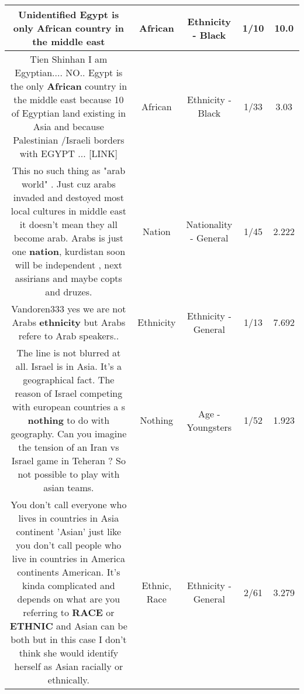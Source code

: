 \documentclass[11pt]{article}
\newlength\mylength
\begin{document}
\begin{center}
\begin{longtable}{|C{.65\mylength}|C{.30\mylength}|C{.12\mylength}|C{.12\mylength}|C{.12\mylength}|}
  \small Unidentified Egypt is only \textbf{African} country in the middle east\normalsize   & African & Ethnicity - Black & 1/10 & 10.0 \\  \hline
  \small Tien Shinhan  I am Egyptian.... NO.. Egypt is the only \textbf{African} country in the middle east because 10 of Egyptian land existing in Asia and because Palestinian /Israeli borders with EGYPT ...  [LINK] \normalsize   & African & Ethnicity - Black & 1/33 & 3.03 \\  \hline
  \small This no such thing as "arab world" . Just cuz arabs invaded and destoyed most local cultures  in middle east it doesn't mean they all become arab. Arabs is just one \textbf{nation}, kurdistan soon will be independent , next assirians and maybe copts and druzes.\normalsize   & Nation & Nationality - General & 1/45 & 2.222 \\  \hline
  \small Vandoren333 yes we are not Arabs \textbf{ethnicity} but Arabs refere to Arab speakers..\normalsize   & Ethnicity & Ethnicity - General & 1/13 & 7.692 \\  \hline
  \small The line is not blurred at all. Israel is in Asia. It's a geographical fact. The reason of Israel competing with european countries a s \textbf{nothing} to do with geography.  Can you imagine the tension of an Iran vs Israel game in Teheran ? So not possible to play with asian teams.\normalsize   & Nothing & Age - Youngsters & 1/52 & 1.923 \\  \hline
  \small You don't call everyone who lives in countries in Asia continent 'Asian' just like you don't call people who live in countries in America continents American. It's kinda complicated and depends on what are you referring to \textbf{RACE} or \textbf{ETHNIC} and Asian can be both but in this case I don't think she would identify herself as Asian racially or ethnically.\normalsize   & Ethnic, Race & Ethnicity - General & 2/61 & 3.279 \\  \hline

\end{longtable}
\end{center}
\end{document}
